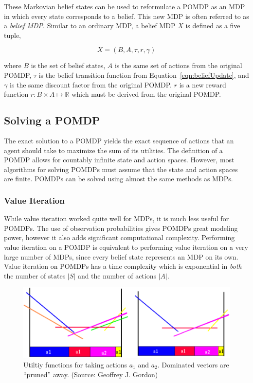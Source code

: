 \documentclass[tog]{acmsiggraph}
\newcommand{\reals}{\mathbb{R}}
\begin{document}
These Markovian belief states can be used to reformulate a POMDP as an MDP in which every state 
corresponds to a belief. This new MDP is often referred to as a \textit{belief MDP}. Similar to 
an ordinary MDP, a belief MDP $X$ is defined as a five tuple,

\begin{equation*}
  X = \left(B, A, \tau, r, \gamma \right)
\end{equation*}

where $B$ is the set of belief states, $A$ is the same set of actions from the original POMDP, 
$\tau$ is the belief transition function from Equation~\ref{eqn:beliefUpdate}, and $\gamma$ is 
the same discount factor from the original POMDP. \@ $r$ is a new reward function 
$r: B \times A \mapsto \reals$ which must be derived from the original POMDP.

\subsection{Solving a POMDP}

The exact solution to a POMDP yields the exact sequence of actions that an agent should take 
to maximize the sum of its utilities. The definition of a POMDP allows for countably infinite 
state and action spaces. However, most algorithms for solving POMDPs must assume that the 
state and action spaces are finite. POMDPs can be solved using almost the same methods as MDPs.

\subsubsection{Value Iteration}
While value iteration worked quite well for MDPs, it is much less useful for POMDPs. The use of 
observation probabilities gives POMDPs great modeling power, however it also adds significant 
computational complexity. Performing value iteration on a POMDP is equivalent to performing value 
iteration on a very large number of MDPs, since every belief state represents an MDP on its own. 
Value iteration on POMDPs has a time complexity which is exponential in \textit{both} the number 
of states $|S|$ and the number of actions $|A|$.

\begin{figure}[h]
  \centering
  \includegraphics[width=\columnwidth]{combinedValueFunctions.png}
  \caption{Utiltiy functions for taking actions $a_1$ and $a_2$. Dominated vectors are ``pruned'' away. (Source: Geoffrey J. Gordon)}
  \label{fig:combinedValue}
\end{figure}
\end{document}
